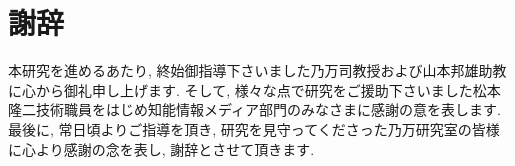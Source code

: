 \chapter*{謝辞}\label{chap:thank}
本研究を進めるあたり, 終始御指導下さいました乃万司教授および山本邦雄助教に心から御礼申し上げます. そして, 様々な点で研究をご援助下さいました松本隆二技術職員をはじめ知能情報メディア部門のみなさまに感謝の意を表します. 最後に, 常日頃よりご指導を頂き, 研究を見守ってくださった乃万研究室の皆様に心より感謝の念を表し, 謝辞とさせて頂きます.
